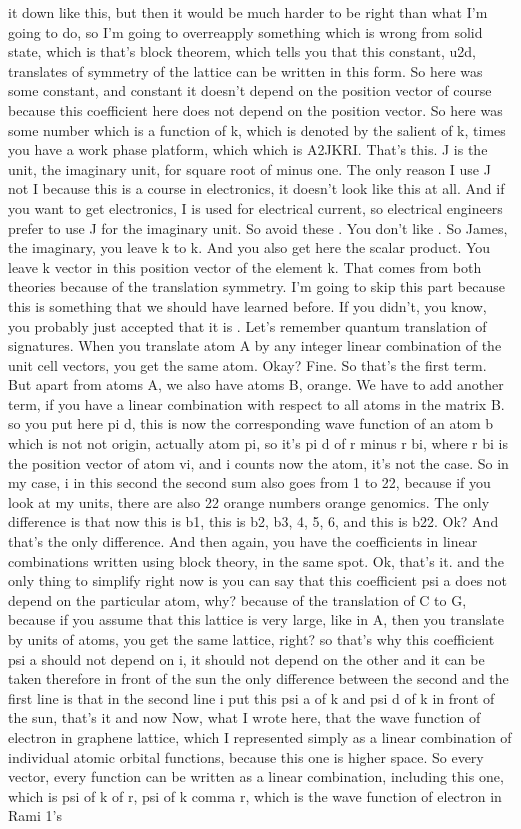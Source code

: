 it down like this, but then it would be much harder to be right than what I'm going to do, so I'm going to overreapply something which is wrong from solid state, which is that's block theorem, which tells you that this constant, u2d, translates of symmetry of the lattice can be written in this form. So here was some constant, and constant it doesn't depend on the position vector of course because this coefficient here does not depend on the position vector. So here was some number which is a function of k, which is denoted by the salient of k, times you have a work phase platform, which which is A2JKRI. That's this. J is the unit, the imaginary unit, for square root of minus one. The only reason I use J not I because this is a course in electronics, it doesn't look like this at all. And if you want to get electronics, I is used for electrical current, so electrical engineers prefer to use J for the imaginary unit. So avoid these . You don't like . So James, the imaginary, you leave k to k. And you also get here the scalar product. You leave k vector in this position vector of the element k. That comes from both theories because of the translation symmetry. I'm going to skip this part because this is something that we should have learned before. If you didn't, you know, you probably just accepted that it is . Let's remember quantum translation of signatures. When you translate atom A by any integer linear combination of the unit cell vectors, you get the same atom. Okay? Fine. So that's the first term. But apart from atoms A, we also have atoms B, orange. We have to add another term, if you have a linear combination with respect to all atoms in the matrix B. so you put here pi d, this is now the corresponding wave function of an atom b which is not not origin, actually atom pi, so it's pi d of r minus r bi, where r bi is the position vector of atom vi, and i counts now the atom, it's not the case. So in my case, i in this second the second sum also goes from 1 to 22, because if you look at my units, there are also 22 orange numbers orange genomics. The only difference is that now this is b1, this is b2, b3, 4, 5, 6, and this is b22. Ok? And that's the only difference. And then again, you have the coefficients in linear combinations written using block theory, in the same spot. Ok, that's it. and the only thing to simplify right now is you can say that this coefficient psi a does not depend on the particular atom, why? because of the translation of C to G, because if you assume that this lattice is very large, like in A, then you translate by units of atoms, you get the same lattice, right? so that's why this coefficient psi a should not depend on i, it should not depend on the other and it can be taken therefore in front of the sun the only difference between the second and the first line is that in the second line i put this psi a of k and psi d of k in front of the sun, that's it and now Now, what I wrote here, that the wave function of electron in graphene lattice, which I represented simply as a linear combination of individual atomic orbital functions, because this one is higher space. So every vector, every function can be written as a linear combination, including this one, which is psi of k of r, psi of k comma r, which is the wave function of electron in Rami 1's 